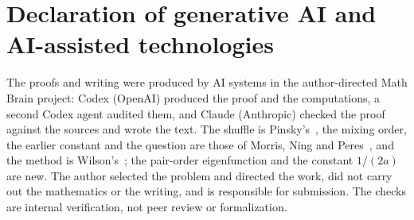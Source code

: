 \documentclass[11pt,a4paper]{article}
\numberwithin{equation}{section}
\theoremstyle{remark}
\begin{document}
\section*{Declaration of generative AI and AI-assisted technologies}
The proofs and writing were produced by AI systems in the author-directed Math Brain project: Codex (OpenAI) produced the proof and the computations, a second Codex agent audited them, and Claude (Anthropic) checked the proof against the sources and wrote the text. The shuffle is Pinsky's~\cite{Pin}, the mixing order, the earlier constant and the question are those of Morris, Ning and Peres~\cite{MNP}, and the method is Wilson's~\cite{Wil,Wil03}; the pair-order eigenfunction and the constant $1/(2a)$ are new. The author selected the problem and directed the work, did not carry out the mathematics or the writing, and is responsible for submission. The checks are internal verification, not peer review or formalization.
\end{document}
